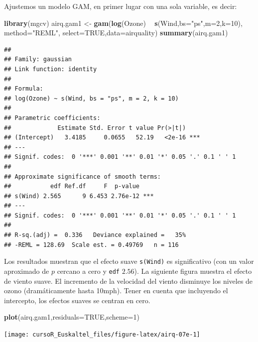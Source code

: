 \documentclass[]{book}
\newenvironment{Shaded}{\begin{snugshade}}{\end{snugshade}}
\newcommand{\KeywordTok}[1]{\textcolor[rgb]{0.13,0.29,0.53}{\textbf{#1}}}
\newcommand{\DataTypeTok}[1]{\textcolor[rgb]{0.13,0.29,0.53}{#1}}
\newcommand{\DecValTok}[1]{\textcolor[rgb]{0.00,0.00,0.81}{#1}}
\newcommand{\StringTok}[1]{\textcolor[rgb]{0.31,0.60,0.02}{#1}}
\newcommand{\OtherTok}[1]{\textcolor[rgb]{0.56,0.35,0.01}{#1}}
\newcommand{\OperatorTok}[1]{\textcolor[rgb]{0.81,0.36,0.00}{\textbf{#1}}}
\newcommand{\NormalTok}[1]{#1}
\begin{document}
Ajustemos un modelo GAM, en primer lugar con una sola variable, es
decir:

\begin{Shaded}
\begin{Highlighting}[]
\KeywordTok{library}\NormalTok{(mgcv)}
\NormalTok{airq.gam1 <-}\StringTok{ }\KeywordTok{gam}\NormalTok{(}\KeywordTok{log}\NormalTok{(Ozone) }\OperatorTok{~}\StringTok{ }\KeywordTok{s}\NormalTok{(Wind,}\DataTypeTok{bs=}\StringTok{"ps"}\NormalTok{,}\DataTypeTok{m=}\DecValTok{2}\NormalTok{,}\DataTypeTok{k=}\DecValTok{10}\NormalTok{),}
                 \DataTypeTok{method=}\StringTok{"REML"}\NormalTok{, }\DataTypeTok{select=}\OtherTok{TRUE}\NormalTok{,}\DataTypeTok{data=}\NormalTok{airquality)}
\KeywordTok{summary}\NormalTok{(airq.gam1)}
\end{Highlighting}
\end{Shaded}

\begin{verbatim}
## 
## Family: gaussian 
## Link function: identity 
## 
## Formula:
## log(Ozone) ~ s(Wind, bs = "ps", m = 2, k = 10)
## 
## Parametric coefficients:
##             Estimate Std. Error t value Pr(>|t|)    
## (Intercept)   3.4185     0.0655   52.19   <2e-16 ***
## ---
## Signif. codes:  0 '***' 0.001 '**' 0.01 '*' 0.05 '.' 0.1 ' ' 1
## 
## Approximate significance of smooth terms:
##           edf Ref.df     F  p-value    
## s(Wind) 2.565      9 6.453 2.76e-12 ***
## ---
## Signif. codes:  0 '***' 0.001 '**' 0.01 '*' 0.05 '.' 0.1 ' ' 1
## 
## R-sq.(adj) =  0.336   Deviance explained =   35%
## -REML = 128.69  Scale est. = 0.49769   n = 116
\end{verbatim}

Los resultados muestran que el efecto suave \texttt{s(Wind)} es
significativo (con un valor aproximado de \(p\) cercano a cero y
\texttt{edf} \(2.56\)). La siguiente figura muestra el efecto de viento
suave. El incremento de la velocidad del viento disminuye los niveles de
ozono (dramáticamente hasta 10mph). Tener en cuenta que incluyendo el
intercepto, los efectos suaves se centran en cero.

\begin{Shaded}
\begin{Highlighting}[]
\KeywordTok{plot}\NormalTok{(airq.gam1,}\DataTypeTok{residuals=}\OtherTok{TRUE}\NormalTok{,}\DataTypeTok{scheme=}\DecValTok{1}\NormalTok{)}
\end{Highlighting}
\end{Shaded}

\begin{center}\texttt{[image: cursoR\_Euskaltel\_files/figure-latex/airq-07e-1]} \end{center}
\end{document}
